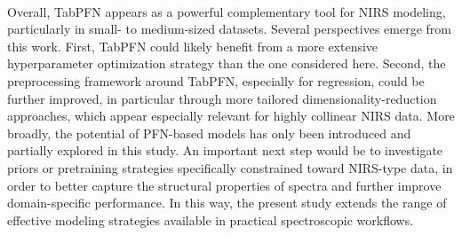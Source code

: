 \documentclass{article}
\begin{document}
~

Overall, TabPFN appears as a powerful complementary tool for NIRS modeling, particularly in small- to medium-sized datasets. Several perspectives emerge from this work. First, TabPFN could likely benefit from a more extensive hyperparameter optimization strategy than the one considered here. Second, the preprocessing framework around TabPFN, especially for regression, could be further improved, in particular through more tailored dimensionality-reduction approaches, which appear especially relevant for highly collinear NIRS data. More broadly, the potential of PFN-based models has only been introduced and partially explored in this study. An important next step would be to investigate priors or pretraining strategies specifically constrained toward NIRS-type data, in order to better capture the structural properties of spectra and further improve domain-specific performance. In this way, the present study extends the range of effective modeling strategies available in practical spectroscopic workflows.


\end{document}
